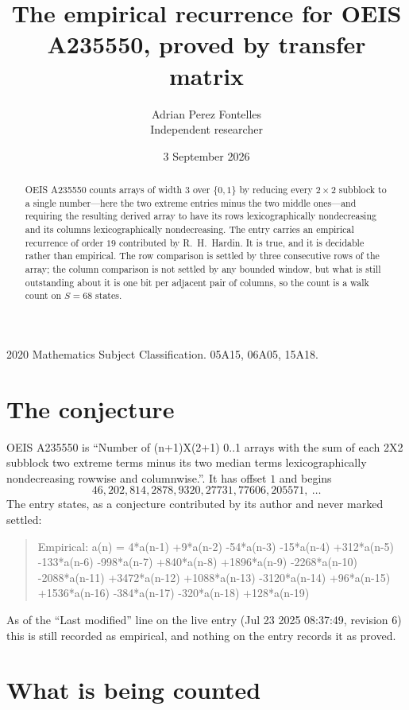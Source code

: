 \documentclass[11pt,a4paper]{article}
\title{The empirical recurrence for OEIS A235550, proved by transfer matrix}
\author{Adrian Perez Fontelles\\ \small Independent researcher}
\date{3 September 2026}
\theoremstyle{plain}
\theoremstyle{definition}
\begin{document}
\maketitle

\begin{abstract}
OEIS A235550 counts arrays of width $3$ over $\{0,1\}$ by reducing every $2\times2$ subblock to a
single number---here the two extreme entries minus the two middle ones---and requiring the resulting derived array to have its rows
lexicographically nondecreasing and its columns lexicographically nondecreasing. The entry carries an
empirical recurrence of order $19$ contributed by R.~H.~Hardin. It is true, and it is
decidable rather than empirical. The row comparison is settled by three consecutive rows of the
array; the column comparison is not settled by any bounded window, but what is still outstanding
about it is one bit per adjacent pair of columns, so the count is a walk count on $S=68$
states.
\end{abstract}

\noindent\small 2020 Mathematics Subject Classification. 05A15, 06A05, 15A18.\normalsize

\section{The conjecture}

OEIS A235550 is ``Number of (n+1)X(2+1) 0..1 arrays with the sum of each 2X2 subblock two extreme terms minus its two median terms lexicographically nondecreasing rowwise and columnwise.''. It has offset $1$ and begins
\[
46, 202, 814, 2878, 9320, 27731, 77606, 205571,\ \dots
\]
The entry states, as a conjecture contributed by its author and never marked settled:
\begin{quote}
Empirical: a(n) = 4*a(n-1) +9*a(n-2) -54*a(n-3) -15*a(n-4) +312*a(n-5) -133*a(n-6) -998*a(n-7) +840*a(n-8) +1896*a(n-9) -2268*a(n-10) -2088*a(n-11) +3472*a(n-12) +1088*a(n-13) -3120*a(n-14) +96*a(n-15) +1536*a(n-16) -384*a(n-17) -320*a(n-18) +128*a(n-19)
\end{quote}
As of the ``Last modified'' line on the live entry (Jul 23 2025 08:37:49, revision 6) this is still
recorded as empirical, and nothing on the entry records it as proved.

\section{What is being counted}
\end{document}
